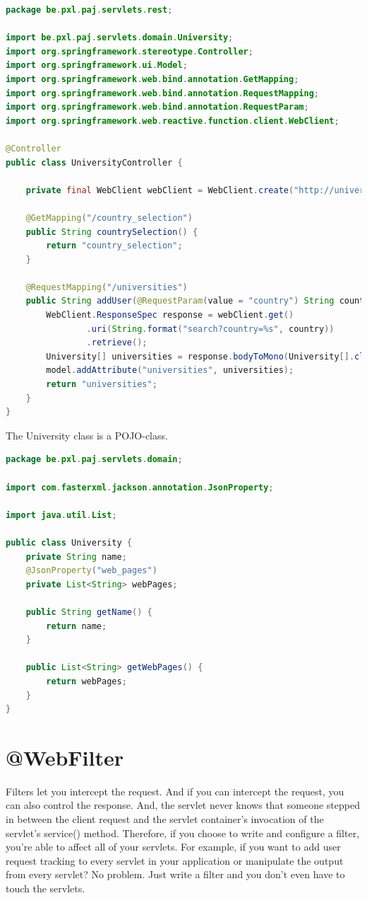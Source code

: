 \begin{lstlisting}[language=java, frame=single]
package be.pxl.paj.servlets.rest;

import be.pxl.paj.servlets.domain.University;
import org.springframework.stereotype.Controller;
import org.springframework.ui.Model;
import org.springframework.web.bind.annotation.GetMapping;
import org.springframework.web.bind.annotation.RequestMapping;
import org.springframework.web.bind.annotation.RequestParam;
import org.springframework.web.reactive.function.client.WebClient;

@Controller
public class UniversityController {

	private final WebClient webClient = WebClient.create("http://universities.hipolabs.com");

	@GetMapping("/country_selection")
	public String countrySelection() {
		return "country_selection";
	}

	@RequestMapping("/universities")
	public String addUser(@RequestParam(value = "country") String country, Model model) {
		WebClient.ResponseSpec response = webClient.get()
				.uri(String.format("search?country=%s", country))
				.retrieve();
		University[] universities = response.bodyToMono(University[].class).block();
		model.addAttribute("universities", universities);
		return "universities";
	}
}

\end{lstlisting}

The University class is a POJO-class.

\begin{lstlisting}[language=java, frame=single]
package be.pxl.paj.servlets.domain;

import com.fasterxml.jackson.annotation.JsonProperty;

import java.util.List;

public class University {
	private String name;
	@JsonProperty("web_pages")
	private List<String> webPages;

	public String getName() {
		return name;
	}

	public List<String> getWebPages() {
		return webPages;
	}
}
\end{lstlisting}


\section{@WebFilter}

Filters let you intercept the request.  And if you can intercept the request,
you can also control the response.  And, the servlet  never
knows that someone stepped in between the client request and the servlet container’s invocation 
of the servlet’s service() method.  Therefore,  if you choose to write and configure a filter, you're able to affect all of your servlets.  For example, if you want to add
user request tracking to every servlet in your application or manipulate the output
from every servlet? No problem.  Just write a filter and you don’t even have to touch the servlets.

